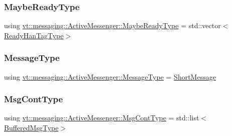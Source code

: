 \mbox{\label{structvt_1_1messaging_1_1_active_messenger_a745d5e8cad8c2f67d20479afacc6e134}} 
\subsubsection{\texorpdfstring{Maybe\+Ready\+Type}{MaybeReadyType}}
{\footnotesize\ttfamily using \hyperlink{structvt_1_1messaging_1_1_active_messenger_a745d5e8cad8c2f67d20479afacc6e134}{vt\+::messaging\+::\+Active\+Messenger\+::\+Maybe\+Ready\+Type} =  std\+::vector$<$\hyperlink{structvt_1_1messaging_1_1_active_messenger_a98bb74aa4a561161dd7c7073dcd5f1d3}{Ready\+Han\+Tag\+Type}$>$}

\mbox{\label{structvt_1_1messaging_1_1_active_messenger_a720a2b1e7462d414b2a51d9fe005eca9}} 
\subsubsection{\texorpdfstring{Message\+Type}{MessageType}}
{\footnotesize\ttfamily using \hyperlink{structvt_1_1messaging_1_1_active_messenger_a720a2b1e7462d414b2a51d9fe005eca9}{vt\+::messaging\+::\+Active\+Messenger\+::\+Message\+Type} =  \hyperlink{namespacevt_a1125ac1da6c0bbf141e0ea0739d7602d}{Short\+Message}}

\mbox{\label{structvt_1_1messaging_1_1_active_messenger_a18bbfbf9ecd82b33f6fc475b2e5290a5}} 
\subsubsection{\texorpdfstring{Msg\+Cont\+Type}{MsgContType}}
{\footnotesize\ttfamily using \hyperlink{structvt_1_1messaging_1_1_active_messenger_a18bbfbf9ecd82b33f6fc475b2e5290a5}{vt\+::messaging\+::\+Active\+Messenger\+::\+Msg\+Cont\+Type} =  std\+::list$<$\hyperlink{structvt_1_1messaging_1_1_active_messenger_a80a9cbda399d7bf035bfcecc761f4b02}{Buffered\+Msg\+Type}$>$}

